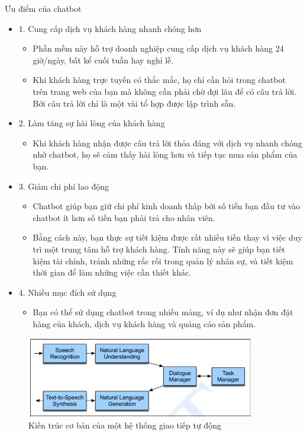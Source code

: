 Ưu điểm của chatbot
\begin{itemize}
    \item 1. Cung cấp dịch vụ khách hàng nhanh chóng hơn
          \begin{itemize}
              \item Phần mềm này hỗ trợ doanh nghiệp cung cấp dịch vụ khách hàng 24 giờ/ngày, bất kể cuối tuần hay nghỉ lễ.
              \item Khi khách hàng trực tuyến có thắc mắc, họ chỉ cần hỏi trong chatbot trên trang web của bạn mà không cần phải chờ đợi lâu để có câu trả lời. Bởi câu trả lời chỉ là một vài tổ hợp được lập trình sẵn.
          \end{itemize}
    \item 2. Làm tăng sự hài lòng của khách hàng
          \begin{itemize}
              \item Khi khách hàng nhận được câu trả lời thỏa đáng với dịch vụ nhanh chóng nhờ chatbot, họ sẽ cảm thấy hài lòng hơn và tiếp tục mua sản phẩm của bạn.
          \end{itemize}
    \item 3. Giảm chi phí lao động
          \begin{itemize}
              \item Chatbot giúp bạn giữ chi phí kinh doanh thấp bởi số tiền bạn đầu tư vào chatbot ít hơn số tiền bạn phải trả cho nhân viên.
              \item Bằng cách này, bạn thực sự tiết kiệm được rất nhiều tiền thay vì việc duy trì một trung tâm hỗ trợ khách hàng. Tính năng này sẽ giúp bạn tiết kiệm tài chính, tránh những rắc rối trong quản lý nhân sự, và tiết kiệm thời gian để làm những việc cần thiết khác.
          \end{itemize}
    \item 4. Nhiều mục đích sử dụng
          \begin{itemize}
              \item Bạn có thể sử dụng chatbot trong nhiều mảng, ví dụ như nhận đơn đặt hàng của khách, dịch vụ khách hàng và quảng cáo sản phẩm.

          \end{itemize}


\end{itemize}
\begin{figure}[htp]
    \centering
    \includegraphics[width=10cm]{images/k.jpg}
    \caption{Kiến trúc cơ bản của một hệ thống giao tiếp tự động}
    \label{fig:system-class-intent}
\end{figure}


